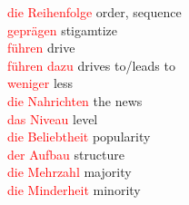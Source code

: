 \documentclass{article}
\begin{document}
	\textcolor{red}{die Reihenfolge} order, sequence \\ 
	\textcolor{red}{geprägen} stigamtize\\
	\textcolor{red}{führen} drive\\
	\textcolor{red}{führen dazu} drives to/leads to\\
	\textcolor{red}{weniger} less\\
	\textcolor{red}{die Nahrichten} the news \\
	\textcolor{red}{das Niveau} level \\
	\textcolor{red}{die Beliebtheit} popularity\\
	\textcolor{red}{der Aufbau} structure \\
	\textcolor{red}{die Mehrzahl} majority\\
	\textcolor{red}{die Minderheit} minority\\
	
	
	
	
	
	
	
	
	\clearpage
	
	\printglossaries
	
\end{document}

